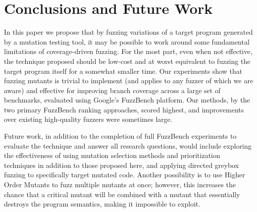 \section{Conclusions and Future Work}

In this paper we propose that by fuzzing variations of a target program generated by a mutation testing tool, it may be possible to work around some fundamental limitations of coverage-driven fuzzing.  For the most part, even when not effective, the technique proposed should be low-cost and at worst equivalent to fuzzing the target program itself for a somewhat smaller time.  Our experiments show that fuzzing mutants is trivial to implement (and applies to any fuzzer of which we are aware) and effective for improving branch coverage across a large set of benchmarks, evaluated using Google's FuzzBench platform.  Our methods, by the two primary FuzzBench ranking approaches, scored highest, and improvements over existing high-quality fuzzers were sometimes large.

Future work, in addition to the completion of full FuzzBench experiments to evaluate the technique and answer all research questions, would include exploring the effectiveness of using mutation selection methods and prioritization techniques in addition to those proposed here, and applying directed greybox fuzzing \cite{AFLGo} to specifically target mutated code.  Another possibility is to use Higher Order Mutants \cite{HOM} to fuzz multiple mutants at once; however, this increases the chance that a critical mutant will be combined with a mutant that essentially destroys the program semantics, making it impossible to exploit.

